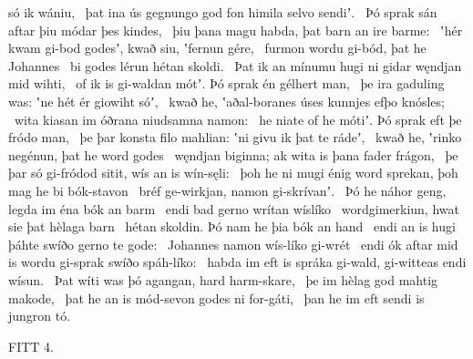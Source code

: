 só ik wániu, \hld\ þat ina ús gegnungo god fon himila
selvo sendiʼ. \hld\ Þó sprak sán aftar
þiu módar þes kindes, \hld\ þiu þana magu habda,
þat barn an ire barme: \hld\ ʽhér kwam gi-bod godesʼ, kwað siu,
ʽfernun gére, \hld\ furmon wordu
gi-bód, þat he Johannes \hld\ bi godes lérun
hétan skoldi. \hld\ Þat ik an mínumu hugi ni gidar
węndjan mid wihti, \hld\ of ik is gi-waldan mótʼ.
Þó sprak én gélhert man, \hld\ þe ira gaduling was:
ʽne hét ér giowiht sóʼ, \hld\ kwað he, ʽaðal-boranes
úses kunnjes efþo knósles; \hld\ wita kiasan im óðrana
niudsamna namon: \hld\ he niate of he mótiʼ.
Þó sprak eft þe fródo man, \hld\ þe þar konsta filo mahlian:
ʽni givu ik þat te rádeʼ, \hld\ kwað he, ʽrinko negénun,
þat he word godes \hld\ węndjan biginna;
ak wita is þana fader frágon, \hld\ þe þar só gi-fródod sitit,
wís an is wín-sęli: \hld\ þoh he ni mugi énig word sprekan,
þoh mag he bi bók-stavon \hld\ bréf ge-wirkjan,
namon gi-skrívanʼ. \hld\ Þó he náhor geng,
legda im éna bók an barm \hld\ endi bad gerno
wrítan wíslíko \hld\ wordgimerkiun,
hwat sie þat hèlaga barn \hld\ hétan skoldin.
Þó nam he þia bók an hand \hld\ endi an is hugi þáhte
swíðo gerno te gode: \hld\ Johannes namon
wís-líko gi-wrét \hld\ endi ók aftar mid is wordu gi-sprak
swíðo spáh-líko: \hld\ habda im eft is spráka gi-wald,
gi-witteas endi wísun. \hld\ Þat wíti was þó agangan,
hard harm-skare, \hld\ þe im hèlag god
mahtig makode, \hld\ þat he an is mód-sevon
godes ni for-gáti, \hld\ þan he im eft sendi is jungron tó.

FITT 4.

